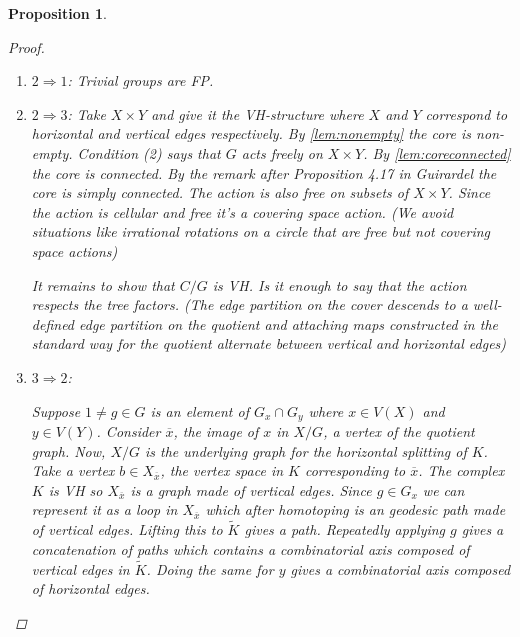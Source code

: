 \documentclass{article}
\theoremstyle{mystyle}
\newtheorem{pro}{Proposition}[section]
\newtheorem*{claim*}{Claim}
\theoremstyle{remark}
\begin{document}
\begin{pro}
\begin{proof}
\begin{enumerate}
    \begin{claim*}
    The action of $G_{x_0}$ on $Y$ is non-trivial.
    \begin{proof}
        Suppose the action were trivial. That is, there exists some $y\in V(Y)$ such that $(G_{x_0})_y=G_{x_0}$. Hence, $G_{x_0}$ is elliptic for the action of $G$ on $Y$. By the local finiteness of $Y$, for all $x\in V(X)$ $G_x$ acts elliptically on $Y$. Hence, $\mathcal{E}(X)\subset \mathcal{E}(Y)$. Again by local finiteness we can promote this using \ref{thm:ellipticimpliesequality} to $\mathcal{E}(X) = \mathcal{E}(Y)$ which by theorem \ref{thm:forester} gives $X \sim Y$ which contradicts the fact that $X$ and $Y$ were assumed to be in different deformation spaces.
    \end{proof}
    \end{claim*}
    \item $2\Rightarrow 1$: Trivial groups are FP.
    \item $2\Rightarrow 3$: Take $X \times Y$ and give it the VH-structure where $X$ and $Y$ correspond to horizontal and vertical edges respectively. By \ref{lem:nonempty} the core is non-empty. Condition (2) says that $G$ acts freely on $X\times Y$. By \ref{lem:coreconnected} the core is connected. By the remark after Proposition 4.17 in Guirardel the core is simply connected. The action is also free on subsets of $X \times Y$. Since the action is cellular and free it's a covering space action. (We avoid situations like irrational rotations on a circle that are free but not covering space actions) 
    
    It remains to show that $C/G$ is VH. Is it enough to say that the action respects the tree factors. (The edge partition on the cover descends to a well-defined edge partition on the quotient and attaching maps constructed in the standard way for the quotient alternate between vertical and horizontal edges)
    
\item $3\Rightarrow 2$: 
    

    Suppose $1\neq g \in G$ is an element of $G_x\cap G_y$ where $x \in V(X)$ and $y\in V(Y)$. Consider $\overline{x}$, the image of $x$ in $X/G$, a vertex of the quotient graph. Now, $X/G$ is the underlying graph for the horizontal splitting of $K$. Take a vertex $b \in X_{\overline{x}}$, the vertex space in $K$ corresponding to $\overline{x}$. The complex $K$ is VH so $X_\overline{x}$ is a graph made of vertical edges. Since $g\in G_x$ we can represent it as a loop in $X_{\overline{x}}$  which after homotoping is an geodesic path made of vertical edges. Lifting this to $\widetilde{K}$ gives a path. Repeatedly applying $g$ gives a concatenation of paths which contains a combinatorial axis composed of vertical edges in $\widetilde{K}$. Doing the same for $y$ gives a combinatorial axis composed of horizontal edges. 
    

\end{enumerate}
\end{proof}
\end{pro}
\end{document}
